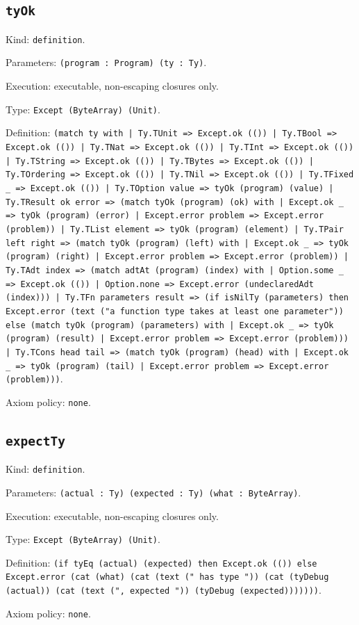 \documentclass[11pt]{article}
\begin{document}
\subsection*{\texttt{tyOk}}
\noindent Kind: \texttt{definition}.\par
\noindent Parameters: \texttt{(program : Program) (ty : Ty)}.\par
\noindent Execution: executable, non-escaping closures only.\par
\noindent Type: \texttt{Except (ByteArray) (Unit)}.\par
\noindent Definition: \texttt{(match ty with | Ty.TUnit => Except.ok (()) | Ty.TBool => Except.ok (()) | Ty.TNat => Except.ok (()) | Ty.TInt => Except.ok (()) | Ty.TString => Except.ok (()) | Ty.TBytes => Except.ok (()) | Ty.TOrdering => Except.ok (()) | Ty.TNil => Except.ok (()) | Ty.TFixed \_ => Except.ok (()) | Ty.TOption value => tyOk (program) (value) | Ty.TResult ok error => (match tyOk (program) (ok) with | Except.ok \_ => tyOk (program) (error) | Except.error problem => Except.error (problem)) | Ty.TList element => tyOk (program) (element) | Ty.TPair left right => (match tyOk (program) (left) with | Except.ok \_ => tyOk (program) (right) | Except.error problem => Except.error (problem)) | Ty.TAdt index => (match adtAt (program) (index) with | Option.some \_ => Except.ok (()) | Option.none => Except.error (undeclaredAdt (index))) | Ty.TFn parameters result => (if isNilTy (parameters) then Except.error (text ("a function type takes at least one parameter")) else (match tyOk (program) (parameters) with | Except.ok \_ => tyOk (program) (result) | Except.error problem => Except.error (problem))) | Ty.TCons head tail => (match tyOk (program) (head) with | Except.ok \_ => tyOk (program) (tail) | Except.error problem => Except.error (problem)))}.\par
\noindent Axiom policy: \texttt{none}.\par
\subsection*{\texttt{expectTy}}
\noindent Kind: \texttt{definition}.\par
\noindent Parameters: \texttt{(actual : Ty) (expected : Ty) (what : ByteArray)}.\par
\noindent Execution: executable, non-escaping closures only.\par
\noindent Type: \texttt{Except (ByteArray) (Unit)}.\par
\noindent Definition: \texttt{(if tyEq (actual) (expected) then Except.ok (()) else Except.error (cat (what) (cat (text (" has type ")) (cat (tyDebug (actual)) (cat (text (", expected ")) (tyDebug (expected)))))))}.\par
\noindent Axiom policy: \texttt{none}.\par
\end{document}
